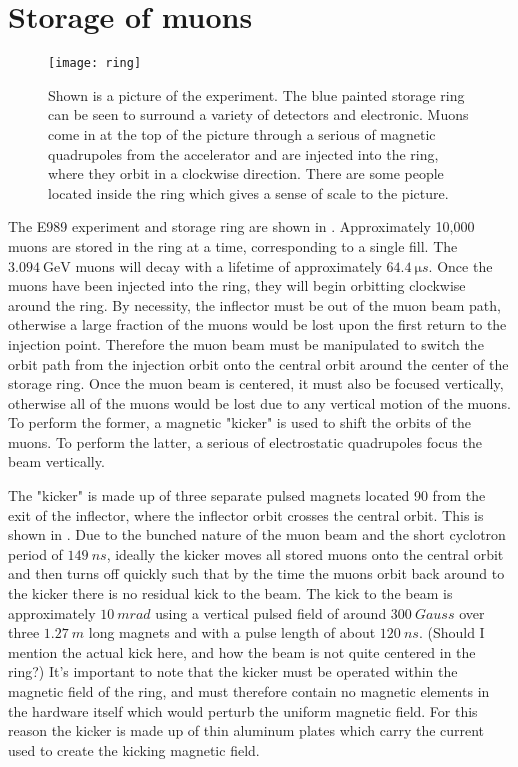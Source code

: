 \section{Storage of muons}
\label{sec:Storage}

\begin{figure}[]
    \centering
    \texttt{[image: ring]}
    \caption[The \gmtwo experiment]{Shown is a picture of the \gmtwo experiment. The blue painted storage ring can be seen to surround a variety of detectors and electronic. Muons come in at the top of the picture through a serious of magnetic quadrupoles from the accelerator and are injected into the ring, where they orbit in a clockwise direction. There are some people located inside the ring which gives a sense of scale to the picture.}   
    \label{fig:ring}
\end{figure}


The E989 experiment and storage ring are shown in . Approximately 10,000 muons are stored in the \gmtwo ring at a time, corresponding to a single fill. The $\SI{3.094}{\GeV}$ muons will decay with a lifetime of approximately $\SI{64.4}{\micro s}$. Once the muons have been injected into the ring, they will begin orbitting clockwise around the ring. By necessity, the inflector must be out of the muon beam path, otherwise a large fraction of the muons would be lost upon the first return to the injection point. Therefore the muon beam must be manipulated to switch the orbit path from the injection orbit onto the central orbit around the center of the storage ring. Once the muon beam is centered, it must also be focused vertically, otherwise all of the muons would be lost due to any vertical motion of the muons. To perform the former, a magnetic "kicker" is used to shift the orbits of the muons. To perform the latter, a serious of electrostatic quadrupoles focus the beam vertically.

The "kicker" is made up of three separate pulsed magnets located 90\textdegree{} from the exit of the inflector, where the inflector orbit crosses the central orbit. This is shown in . Due to the bunched nature of the muon beam and the short cyclotron period of $\SI{149}{ns}$, ideally the kicker moves all stored muons onto the central orbit and then turns off quickly such that by the time the muons orbit back around to the kicker there is no residual kick to the beam. The kick to the beam is approximately $\SI{10}{mrad}$ using a vertical pulsed field of around $\SI{300}{Gauss}$ over three $\SI{1.27}{m}$ long magnets and with a pulse length of about $\SI{120}{ns}$. (Should I mention the actual kick here, and how the beam is not quite centered in the ring?) It's important to note that the kicker must be operated within the magnetic field of the ring, and must therefore contain no magnetic elements in the hardware itself which would perturb the uniform magnetic field. For this reason the kicker is made up of thin aluminum plates which carry the current used to create the kicking magnetic field. %


